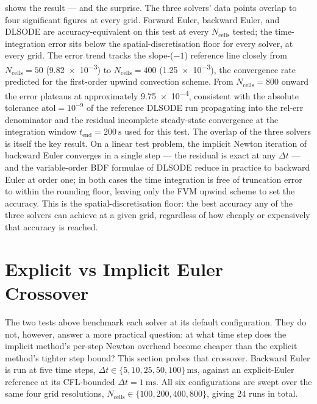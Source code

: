  shows the result --- and the surprise. The three solvers' data points overlap to four significant figures at every grid. Forward Euler, backward Euler, and DLSODE are accuracy-equivalent on this test at every \(N_\mathrm{cells}\) tested; the time-integration error sits below the spatial-discretisation floor for every solver, at every grid. The error trend tracks the slope-(\(-1\)) reference line closely from \(N_\mathrm{cells} = 50\) (\SI{9.82e-3}{}) to \(N_\mathrm{cells} = 400\) (\SI{1.25e-3}{}), the convergence rate predicted for the first-order upwind convection scheme. From \(N_\mathrm{cells} = 800\) onward the error plateaus at approximately \SI{9.75e-4}{}, consistent with the absolute tolerance \(\mathrm{atol} = 10^{-9}\) of the reference DLSODE run propagating into the rel-err denominator and the residual incomplete steady-state convergence at the integration window \(t_\mathrm{end} = \SI{200}{\second}\) used for this test. The overlap of the three solvers is itself the key result. On a linear test problem, the implicit Newton iteration of backward Euler converges in a single step --- the residual is exact at any \(\Delta t\) --- and the variable-order BDF formulae of DLSODE reduce in practice to backward Euler at order one; in both cases the time integration is free of truncation error to within the rounding floor, leaving only the FVM upwind scheme to set the accuracy. This is the spatial-discretisation floor: the best accuracy any of the three solvers can achieve at a given grid, regardless of how cheaply or expensively that accuracy is reached.

\section{Explicit vs Implicit Euler Crossover}\label{sec:euler_comparison}

The two tests above benchmark each solver at its default configuration. They do not, however, answer a more practical question: at what time step does the implicit method's per-step Newton overhead become cheaper than the explicit method's tighter step bound? This section probes that crossover. Backward Euler is run at five time steps, \(\Delta t \in \{5, 10, 25, 50, 100\}\,\si{\milli\second}\), against an explicit-Euler reference at its CFL-bounded \(\Delta t = \SI{1}{\milli\second}\). All six configurations are swept over the same four grid resolutions, \(N_\mathrm{cells} \in \{100, 200, 400, 800\}\), giving 24 runs in total.

